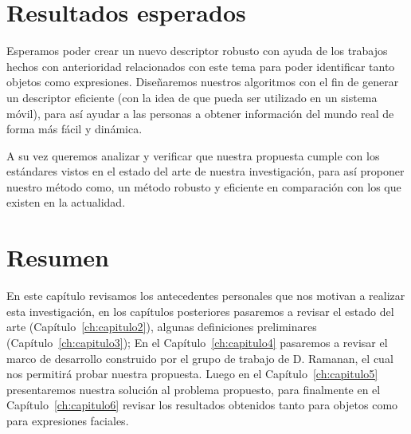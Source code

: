 \section{Resultados esperados}
Esperamos poder crear un nuevo descriptor robusto con ayuda de los trabajos hechos con anterioridad relacionados con este tema para poder identificar tanto objetos como expresiones. Diseñaremos nuestros algoritmos con el fin de generar un descriptor eficiente (con la idea de que pueda ser utilizado en un sistema móvil), para así ayudar a las personas a obtener información del mundo real de forma más fácil y dinámica.

A su vez queremos analizar y verificar que nuestra propuesta cumple con los estándares vistos en el estado del arte de nuestra investigación, para así proponer nuestro método como, un método robusto y eficiente en comparación con los que existen en la actualidad.

\section{Resumen}
En este capítulo revisamos los antecedentes personales que nos motivan a realizar esta investigación, en los capítulos posteriores pasaremos a revisar el estado del arte (Capítulo~\ref{ch:capitulo2}), algunas definiciones preliminares (Capítulo~\ref{ch:capitulo3}); En el Capítulo~\ref{ch:capitulo4} pasaremos a revisar el marco de desarrollo construido por el grupo de trabajo de D. Ramanan, el cual nos permitirá probar nuestra propuesta. Luego en el Capítulo~\ref{ch:capitulo5} presentaremos nuestra solución al problema propuesto, para finalmente en el Capítulo~\ref{ch:capitulo6} revisar los resultados obtenidos tanto para objetos como para expresiones faciales.